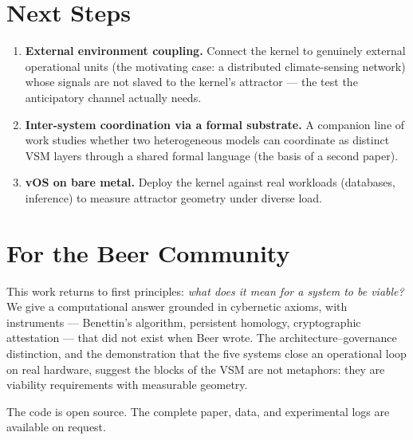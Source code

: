 \documentclass[11pt, a4paper]{article}
\newcommand{\vOS}{\textsf{vOS}}
\begin{document}
\section*{Next Steps}

\begin{enumerate}
  \item \textbf{External environment coupling.} Connect the kernel to genuinely
        external operational units (the motivating case: a distributed climate-sensing
        network) whose signals are not slaved to the kernel's attractor --- the test
        the anticipatory channel actually needs.
  \item \textbf{Inter-system coordination via a formal substrate.} A companion line
        of work studies whether two heterogeneous models can coordinate as distinct
        VSM layers through a shared formal language (the basis of a second paper).
  \item \textbf{\vOS{} on bare metal.} Deploy the kernel against real workloads
        (databases, inference) to measure attractor geometry under diverse load.
\end{enumerate}

\section*{For the Beer Community}

This work returns to first principles: \emph{what does it mean for a system to be
viable?} We give a computational answer grounded in cybernetic axioms, with
instruments --- Benettin's algorithm, persistent homology, cryptographic attestation
--- that did not exist when Beer wrote. The architecture--governance distinction, and
the demonstration that the five systems close an operational loop on real hardware,
suggest the blocks of the VSM are not metaphors: they are viability requirements with
measurable geometry.

The code is open source. The complete paper, data, and experimental logs are
available on request.
\end{document}
